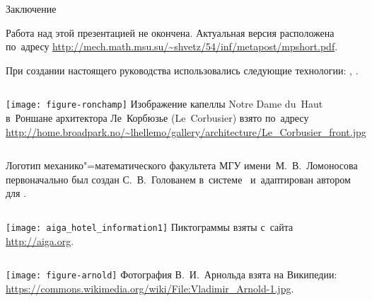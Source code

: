 \begin{frame}{Заключение}

\begin{footnotesize}

Работа над этой презентацией не окончена. Актуальная версия расположена по~адресу
\url{http://mech.math.msu.su/~shvetz/54/inf/metapost/mpshort.pdf}.

При создании настоящего руководства использовались следующие технологии:
, .

\bigskip

\begin{columns}
\centering
\texttt{[image: figure-ronchamp]}
Изображение капеллы \textfrench{Notre Dame du~Haut} в~Роншане архитектора
Ле~Корбюзье (Le~Corbusier) взято по~адресу
\url{http://home.broadpark.no/~lhellemo/gallery/architecture/Le_Corbusier_front.jpg}
\end{columns}

\medskip

\begin{columns}
\centering
{}
Логотип механико"=математического факультета МГУ имени М.~В.~Ломоносова
первоначально был создан С.~В.~Голованем в~системе~
и~адаптирован автором для .
\end{columns}

\medskip

\begin{columns}
\centering
\texttt{[image: aiga\_hotel\_information1]}
Пиктограммы взяты с~сайта \url{http://aiga.org}.
\end{columns}

\medskip

\begin{columns}
\centering
\texttt{[image: figure-arnold]}
Фотография В.~И.~Арнольда взята на Википедии:
\url{https://commons.wikimedia.org/wiki/File:Vladimir_Arnold-1.jpg}.
\end{columns}

\end{footnotesize}
\end{frame}
